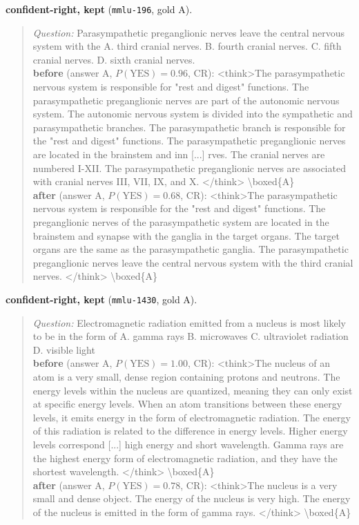 \noindent\textbf{confident-right, kept} (\texttt{mmlu-196}, gold A).
\begin{quote}\scriptsize\emph{Question:} Parasympathetic preganglionic nerves leave the central nervous system with the A. third cranial nerves. B. fourth cranial nerves. C. fifth cranial nerves. D. sixth cranial nerves.\\[2pt]
\textbf{before} (answer A, $P(\mathrm{YES})=0.96$, CR): {\ttfamily \textless{}think\textgreater{}The parasympathetic nervous system is responsible for "rest and digest" functions. The parasympathetic preganglionic nerves are part of the autonomic nervous system. The autonomic nervous system is divided into the sympathetic and parasympathetic branches. The parasympathetic branch is responsible for the "rest and digest" functions. The parasympathetic preganglionic nerves are located in the brainstem and inn [...] rves. The cranial nerves are numbered I-XII. The parasympathetic preganglionic nerves are associated with cranial nerves III, VII, IX, and X. \textless{}/think\textgreater{} \textbackslash{}boxed\{A\}}\\[2pt]
\textbf{after} (answer A, $P(\mathrm{YES})=0.68$, CR): {\ttfamily \textless{}think\textgreater{}The parasympathetic nervous system is responsible for the "rest and digest" functions. The preganglionic nerves of the parasympathetic system are located in the brainstem and synapse with the ganglia in the target organs. The target organs are the same as the parasympathetic ganglia. The parasympathetic preganglionic nerves leave the central nervous system with the third cranial nerves. \textless{}/think\textgreater{} \textbackslash{}boxed\{A\}}
\end{quote}

\noindent\textbf{confident-right, kept} (\texttt{mmlu-1430}, gold A).
\begin{quote}\scriptsize\emph{Question:} Electromagnetic radiation emitted from a nucleus is most likely to be in the form of A. gamma rays B. microwaves C. ultraviolet radiation D. visible light\\[2pt]
\textbf{before} (answer A, $P(\mathrm{YES})=1.00$, CR): {\ttfamily \textless{}think\textgreater{}The nucleus of an atom is a very small, dense region containing protons and neutrons. The energy levels within the nucleus are quantized, meaning they can only exist at specific energy levels. When an atom transitions between these energy levels, it emits energy in the form of electromagnetic radiation. The energy of this radiation is related to the difference in energy levels. Higher energy levels correspond [...] high energy and short wavelength. Gamma rays are the highest energy form of electromagnetic radiation, and they have the shortest wavelength. \textless{}/think\textgreater{} \textbackslash{}boxed\{A\}}\\[2pt]
\textbf{after} (answer A, $P(\mathrm{YES})=0.78$, CR): {\ttfamily \textless{}think\textgreater{}The nucleus is a very small and dense object. The energy of the nucleus is very high. The energy of the nucleus is emitted in the form of gamma rays. \textless{}/think\textgreater{} \textbackslash{}boxed\{A\}}
\end{quote}

